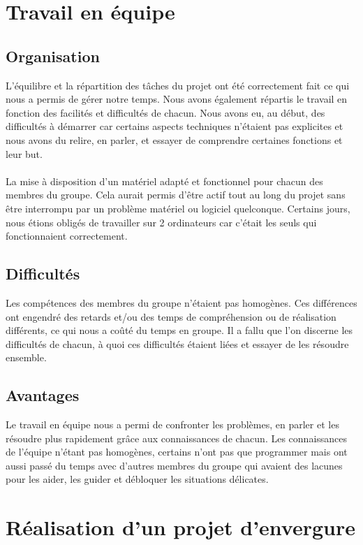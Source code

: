 \documentclass[12pt]{article}
\begin{document}
\section{Travail en équipe}
\subsection{Organisation}

	L'équilibre et la répartition des tâches du projet ont été correctement fait ce qui nous a permis de gérer notre temps. Nous avons également répartis le travail en fonction des facilités et difficultés de chacun. Nous avons eu, au début, des difficultés à démarrer car certains aspects techniques n'étaient pas explicites et nous avons du relire, en parler, et essayer de comprendre certaines fonctions et leur but.\\\\
	La mise à disposition d'un matériel adapté et fonctionnel pour chacun des membres du groupe. Cela aurait permis d'être actif tout au long du projet sans être interrompu par un problème matériel ou logiciel quelconque. Certains jours, nous étions obligés de travailler sur 2 ordinateurs car c'était les seuls qui fonctionnaient correctement.

\subsection{Difficultés}

Les compétences des membres du groupe n'étaient pas homogènes. Ces différences ont engendré des retards et/ou des temps de compréhension ou de réalisation différents, ce qui nous a coûté du temps en groupe. Il a fallu que l'on discerne les difficultés de chacun, à quoi ces difficultés étaient liées et essayer de les résoudre ensemble.

\subsection{Avantages}

Le travail en équipe nous a permi de confronter les problèmes, en parler et les résoudre plus rapidement grâce aux connaissances de chacun. Les connaissances de l'équipe n'étant pas homogènes, certains n'ont pas que programmer mais ont aussi passé du temps avec d'autres membres du groupe qui avaient des lacunes pour les aider, les guider et débloquer les situations délicates.

\newpage

\section{Réalisation d'un projet d'envergure}
\end{document}
